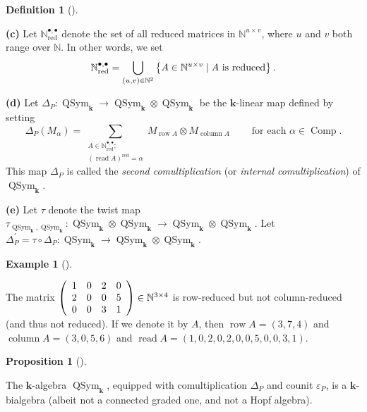 \documentclass
[numbers=enddot,12pt,final,onecolumn,notitlepage,abstracton]{scrartcl}%
\theoremstyle{definition}
\newtheorem{prop}[theo]{Proposition}
\newenvironment{proposition}[1][]
{\begin{prop}[#1]\begin{leftbar}}
{\end{leftbar}\end{prop}}
\newtheorem{defi}[theo]{Definition}
\newenvironment{definition}[1][]
{\begin{defi}[#1]\begin{leftbar}}
{\end{leftbar}\end{defi}}
\newtheorem{exam}[theo]{Example}
\newenvironment{example}[1][]
{\begin{exam}[#1]\begin{leftbar}}
{\end{leftbar}\end{exam}}
\let\sumnonlimits\sum
\let\cupnonlimits\bigcup
\renewcommand{\sum}{\sumnonlimits\limits}
\renewcommand{\bigcup}{\cupnonlimits\limits}
\begin{document}
\begin{definition}
\textbf{(c)} Let $\mathbb{N}_{\operatorname*{red}}^{\bullet,\bullet}$ denote
the set of all reduced matrices in $\mathbb{N}^{u\times v}$, where $u$ and $v$
both range over $\mathbb{N}$. In other words, we set
\[
\mathbb{N}_{\operatorname{red}}^{\bullet, \bullet} = \bigcup\limits_{\left(
u, v\right)  \in\mathbb{N}^{2}} \left\{  A \in\mathbb{N}^{u \times v} \mid A
\text{ is reduced} \right\}  .
\]


\textbf{(d)} Let $\Delta_{P}:\operatorname*{QSym}\nolimits_{\mathbf{k}%
}\rightarrow\operatorname*{QSym}\nolimits_{\mathbf{k}}\otimes
\operatorname*{QSym}\nolimits_{\mathbf{k}}$ be the $\mathbf{k}$-linear map
defined by setting%
\[
\Delta_{P}\left(  M_{\alpha}\right)  =\sum_{\substack{A\in\mathbb{N}%
_{\operatorname*{red}}^{\bullet,\bullet};\\\left(  \operatorname*{read}%
A\right)  ^{\operatorname*{red}}=\alpha}}M_{\operatorname*{row}A}\otimes
M_{\operatorname*{column}A}\ \ \ \ \ \ \ \ \ \ \text{for each }\alpha
\in\operatorname*{Comp}.
\]
This map $\Delta_{P}$ is called the \textit{second comultiplication} (or
\textit{internal comultiplication}) of $\operatorname*{QSym}%
\nolimits_{\mathbf{k}}$.

\textbf{(e)} Let $\tau$ denote the twist map $\tau_{\operatorname*{QSym}%
\nolimits_{\mathbf{k}},\operatorname*{QSym}\nolimits_{\mathbf{k}}%
}:\operatorname*{QSym}\nolimits_{\mathbf{k}}\otimes\operatorname*{QSym}%
\nolimits_{\mathbf{k}}\rightarrow\operatorname*{QSym}\nolimits_{\mathbf{k}%
}\otimes\operatorname*{QSym}\nolimits_{\mathbf{k}}$. Let $\Delta_{P}^{\prime
}=\tau\circ\Delta_{P}:\operatorname*{QSym}\nolimits_{\mathbf{k}}%
\rightarrow\operatorname*{QSym}\nolimits_{\mathbf{k}}\otimes
\operatorname*{QSym}\nolimits_{\mathbf{k}}$.
\end{definition}

\begin{example}
The matrix $\left(
\begin{array}
[c]{cccc}%
1 & 0 & 2 & 0\\
2 & 0 & 0 & 5\\
0 & 0 & 3 & 1
\end{array}
\right)  \in\mathbb{N}^{3\times4}$ is row-reduced but not column-reduced (and
thus not reduced). If we denote it by $A$, then $\operatorname*{row}A=\left(
3,7,4\right)  $ and $\operatorname*{column}A=\left(  3,0,5,6\right)  $ and
$\operatorname*{read}A=\left(  1,0,2,0,2,0,0,5,0,0,3,1\right)  $.
\end{example}

\begin{proposition}
\label{prop.QSym.secondbialg}The $\mathbf{k}$-algebra $\operatorname*{QSym}%
\nolimits_{\mathbf{k}}$, equipped with comultiplication $\Delta_{P}$ and
counit $\varepsilon_{P}$, is a $\mathbf{k}$-bialgebra (albeit not a connected
graded one, and not a Hopf algebra).
\end{proposition}
\end{document}
